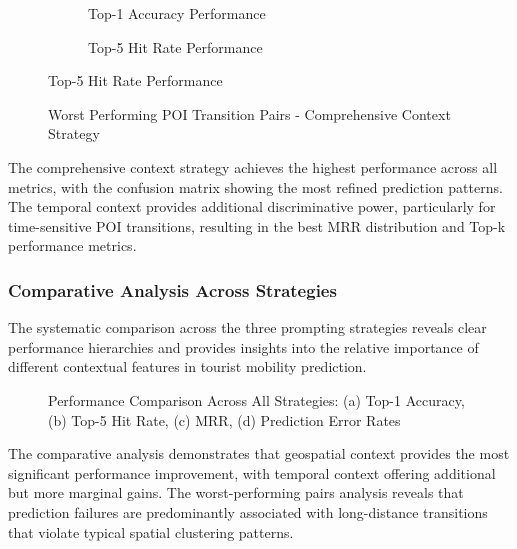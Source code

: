 \documentclass[12pt,a4paper]{article}
\begin{document}
\begin{figure}[h]
\centering
\begin{subfigure}{0.48\textwidth}
\centering
\caption{Top-1 Accuracy Performance}
\label{fig:comprehensive_top1}
\end{subfigure}
\hfill
\begin{subfigure}{0.48\textwidth}
\centering
\caption{Top-5 Hit Rate Performance}
\label{fig:comprehensive_top5}
\end{subfigure}
\end{figure}

\begin{figure}[h]
\centering
\caption{Worst Performing POI Transition Pairs - Comprehensive Context Strategy}
\label{fig:comprehensive_worst_pairs}
\end{figure}

The comprehensive context strategy achieves the highest performance across all metrics, with the confusion matrix showing the most refined prediction patterns. The temporal context provides additional discriminative power, particularly for time-sensitive POI transitions, resulting in the best MRR distribution and Top-k performance metrics.

\subsubsection{Comparative Analysis Across Strategies}

The systematic comparison across the three prompting strategies reveals clear performance hierarchies and provides insights into the relative importance of different contextual features in tourist mobility prediction.

\begin{figure}[h]
\centering
\caption{Performance Comparison Across All Strategies: (a) Top-1 Accuracy, (b) Top-5 Hit Rate, (c) MRR, (d) Prediction Error Rates}
\label{fig:strategy_comparison_detailed}
\end{figure}

The comparative analysis demonstrates that geospatial context provides the most significant performance improvement, with temporal context offering additional but more marginal gains. The worst-performing pairs analysis reveals that prediction failures are predominantly associated with long-distance transitions that violate typical spatial clustering patterns.
\end{document}

